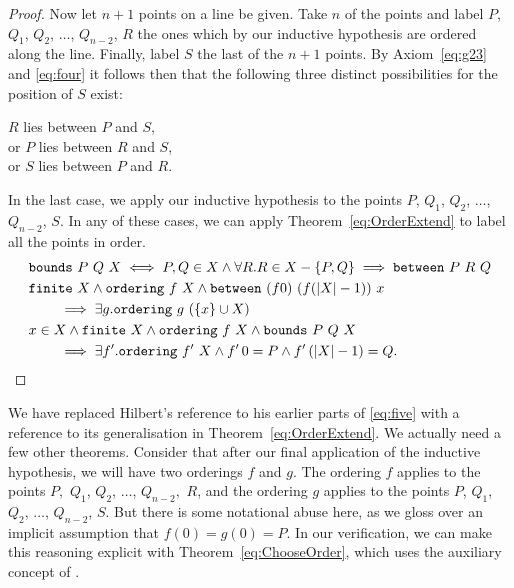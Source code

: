 \begin{proof}
Now let $n+1$ points on a line be given. Take $n$ of the points and label $P$, $Q_1$, $Q_2$, $\ldots$, $Q_{n-2}$, $R$ the ones which by our inductive hypothesis are ordered along the line. Finally, label $S$ the last of the $n+1$ points. By Axiom~\ref{eq:g23} and \ref{eq:four} it follows then that the following three distinct possibilities for the position of $S$ exist:

\vspace{0.5cm}
\noindent $R$ lies between $P$ and $S$,\\
\noindent or $P$ lies between $R$ and $S$,\\
\noindent or $S$ lies between $P$ and $R$.
\vspace{0.5cm}

In the last case, we apply our inductive hypothesis to the points $P$, $Q_1$, $Q_2$, $\ldots$, $Q_{n-2}$, $S$. In any of these cases, we can apply Theorem~\ref{eq:OrderExtend} to label all the points in order.
\begin{align}
  &\texttt{bounds}\ P\ Q\ X \iff P,Q \in X \wedge \forall R. R \in X - \{P,Q\} \implies \texttt{between}\ P\ R\ Q\notag\\
  \label{eq:OrderExtend}
  &\texttt{finite}\ X \wedge \texttt{ordering}\ f\ X \wedge \texttt{between}\ (f 0)\ (f (|X| - 1))\ x\notag\\
  &\qquad \implies \exists g. \texttt{ordering}\ g\ (\{x\} \cup X)\\
  \label{eq:ChooseOrder}
  &x \in X \wedge \texttt{finite}\ X \wedge \texttt{ordering}\ f\ X \wedge \texttt{bounds}\ P\ Q\ X\notag\\
  &\qquad\implies\exists f'. \texttt{ordering}\ f'\ X \wedge f'\,0 = P \wedge f'\,(|X| - 1) = Q.
\end{align}

\end{proof}
We have replaced Hilbert's reference to his earlier parts of \ref{eq:five} with a reference to its generalisation in Theorem~\ref{eq:OrderExtend}. We actually need a few other theorems. Consider that after our final application of the inductive hypothesis, we will have two orderings $f$ and $g$. The ordering $f$ applies to the points $P,$ $Q_1$, $Q_2$, $\ldots$, $Q_{n-2},$ $R$, and the ordering $g$ applies to the points $P$, $Q_1$, $Q_2$, $\ldots$, $Q_{n-2}$, $S$. But  there is some notational abuse here, as we gloss over an implicit assumption that $f(0) = g(0) = P$. In our verification, we can make this reasoning explicit with Theorem~\ref{eq:ChooseOrder}, which uses the auxiliary concept of . 

